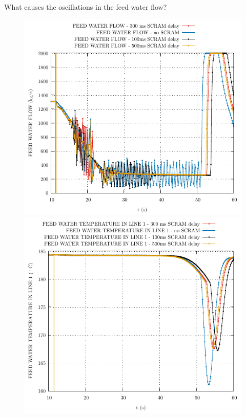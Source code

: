\begin{frame}{What causes the oscillations in the feed water flow?}
	
	\begin{figure}
		\centering
		\begin{minipage}{.5\textwidth}
			\centering
			\includegraphics[width=0.7\linewidth]{./graphs/FEED WATER FLOW_comp.pdf}
		\end{minipage}%
		\begin{minipage}{.5\textwidth}
			\centering
			\includegraphics[width=.7\linewidth]{./graphs/FEED WATER TEMPERATURE IN LINE 1_comp.pdf}
		\end{minipage}
	\end{figure}
	\vspace{-10pt}
	\begin{figure}
		\centering
		\begin{minipage}{.5\textwidth}

\end{minipage}
\end{figure}
\end{frame}
